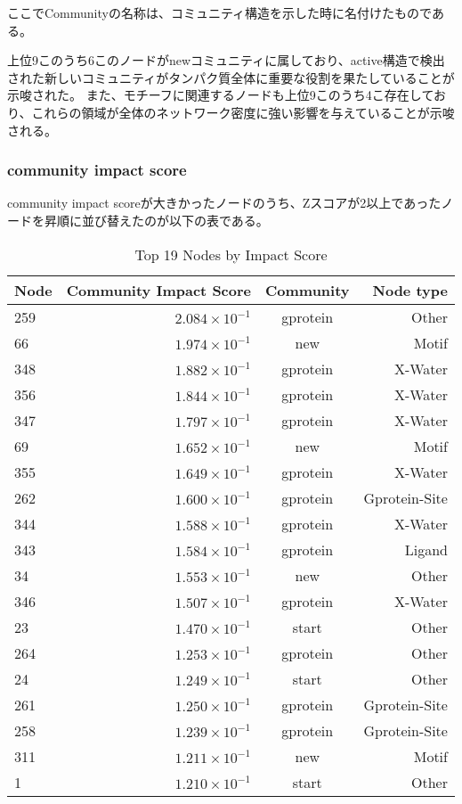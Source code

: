 \newpage

ここでCommunityの名称は、コミュニティ構造を示した時に名付けたものである。

上位9このうち6このノードがnewコミュニティに属しており、active構造で検出された新しいコミュニティがタンパク質全体に重要な役割を果たしていることが示唆された。
また、モチーフに関連するノードも上位9このうち4こ存在しており、これらの領域が全体のネットワーク密度に強い影響を与えていることが示唆される。

\subsubsection{community impact score}
community impact scoreが大きかったノードのうち、Zスコアが2以上であったノードを昇順に並び替えたのが以下の表である。
\begin{table}[ht]
    \centering
    \begin{tabular}{|l|r|c|r|}
    \hline
    \textbf{Node} & \textbf{Community Impact Score} & \textbf{Community} & \textbf{Node type}\\
    \hline
    259 & \( 2.084 \times 10^{-1} \) & gprotein & Other \\
    66 & \( 1.974 \times 10^{-1} \) & new & Motif \\
    348 & \( 1.882 \times 10^{-1} \) & gprotein & X-Water \\
    356 & \( 1.844 \times 10^{-1} \) & gprotein & X-Water \\
    347 & \( 1.797 \times 10^{-1} \) & gprotein & X-Water \\
    69 & \( 1.652 \times 10^{-1} \) & new & Motif \\
    355 & \( 1.649 \times 10^{-1} \) & gprotein & X-Water \\
    262 & \( 1.600 \times 10^{-1} \) & gprotein & Gprotein-Site \\
    344 & \( 1.588 \times 10^{-1} \) & gprotein & X-Water \\
    343 & \( 1.584 \times 10^{-1} \) & gprotein & Ligand \\
    34 & \( 1.553 \times 10^{-1} \) & new & Other \\
    346 & \( 1.507 \times 10^{-1} \) & gprotein & X-Water \\
    23 & \( 1.470 \times 10^{-1} \) & start & Other \\
    264 & \( 1.253 \times 10^{-1} \) & gprotein & Other \\
    24 & \( 1.249 \times 10^{-1} \) & start & Other \\
    261 & \( 1.250 \times 10^{-1} \) & gprotein & Gprotein-Site \\
    258 & \( 1.239 \times 10^{-1} \) & gprotein & Gprotein-Site \\
    311 & \( 1.211 \times 10^{-1} \) & new & Motif \\
    1 & \( 1.210 \times 10^{-1} \) & start & Other \\
    \hline
    \end{tabular}
    \caption{Top 19 Nodes by Impact Score}
\end{table}
  
